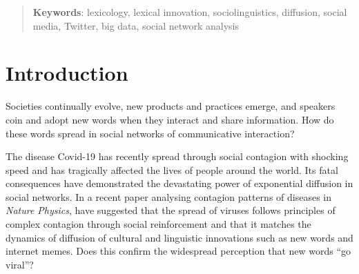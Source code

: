 \documentclass[draft, a4paper, abstract=on]{scrartcl}
\begin{document}
\begin{abstract}
    \vspace{2\baselineskip}

    \textbf{Keywords}: lexicology, lexical innovation, sociolinguistics, diffusion, social media, Twitter, big data, social network analysis

  \end{abstract}


\section{Introduction}

Societies continually evolve, new products and practices emerge, and speakers coin and adopt new words when they interact and share information. How do these words spread in social networks of communicative interaction?

The disease Covid-19 has recently spread through social contagion with shocking speed and has tragically affected the lives of people around the world. Its fatal consequences have demonstrated the devastating power of exponential diffusion in social networks. In a recent paper analysing contagion patterns of diseases in \emph{Nature Physics}, \textcite{Hebert-Dufresne2020MacroscopicPatterns}  have suggested that the spread of viruses follows principles of complex contagion through social reinforcement and that it matches the dynamics of diffusion of cultural and linguistic innovations such as new words and internet memes. Does this confirm the widespread perception that new words \enquote{go viral}?
\end{document}
